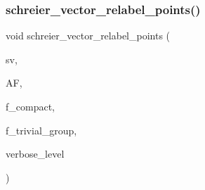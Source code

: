 \subsubsection{\texorpdfstring{schreier\+\_\+vector\+\_\+relabel\+\_\+points()}{schreier\_vector\_relabel\_points()}}
{\footnotesize\ttfamily void schreier\+\_\+vector\+\_\+relabel\+\_\+points (\begin{DoxyParamCaption}\item[{\mbox{\hyperlink{galois_8h_a09fddde158a3a20bd2dcadb609de11dc}{I\+NT}} $\ast$}]{sv,  }\item[{\mbox{\hyperlink{classaction__on__factor__space}{action\+\_\+on\+\_\+factor\+\_\+space}} $\ast$}]{AF,  }\item[{\mbox{\hyperlink{galois_8h_a09fddde158a3a20bd2dcadb609de11dc}{I\+NT}}}]{f\+\_\+compact,  }\item[{\mbox{\hyperlink{galois_8h_a09fddde158a3a20bd2dcadb609de11dc}{I\+NT}}}]{f\+\_\+trivial\+\_\+group,  }\item[{\mbox{\hyperlink{galois_8h_a09fddde158a3a20bd2dcadb609de11dc}{I\+NT}}}]{verbose\+\_\+level }\end{DoxyParamCaption})}

